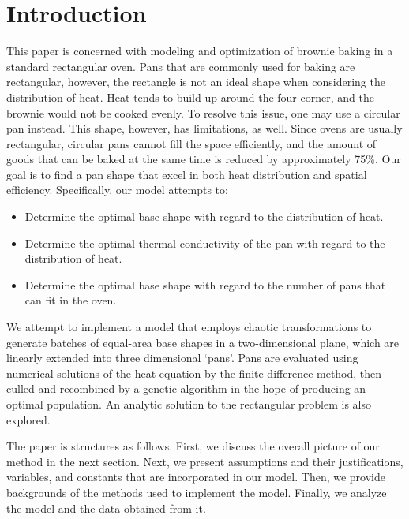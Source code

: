 \documentclass[12pt]{reedmcm}
\begin{document}
\maketitle
\tableofcontents
\listoffigures

\section{Introduction}
This paper is concerned with modeling and optimization of brownie baking in a standard rectangular oven.
Pans that are commonly used for baking are rectangular, however, the rectangle is not an ideal shape when considering the distribution of heat.
Heat tends to build up around the four corner, and the brownie would not be cooked evenly.
To resolve this issue, one may use a circular pan instead.
This shape, however, has limitations, as well.
Since ovens are usually rectangular, circular pans cannot fill the space efficiently, and the amount of goods that can be baked at the same time is reduced by approximately 75\%.
Our goal is to find a pan shape that excel in both heat distribution and spatial efficiency.
Specifically, our model attempts to:
\begin{itemize}
  \item Determine the optimal base shape with regard to the distribution of heat.
  \item Determine the optimal thermal conductivity of the pan with regard to the distribution of heat.
  \item Determine the optimal base shape with regard to the number of pans that can fit in the oven.
\end{itemize}
We attempt to implement a model that employs chaotic transformations to generate batches of equal-area base shapes in a two-dimensional plane, which are linearly extended into three dimensional `pans'.
Pans are evaluated using numerical solutions of the heat equation by the finite difference method, then culled and recombined by a genetic algorithm in the hope of producing an optimal population. 
An analytic solution to the rectangular problem is also explored.

The paper is structures as follows.
First, we discuss the overall picture of our method in the next section.
Next, we present assumptions and their justifications, variables, and constants that are incorporated in our model.
Then, we provide backgrounds of the methods used to implement the model.
Finally, we analyze the model and the data obtained from it.
\end{document}
